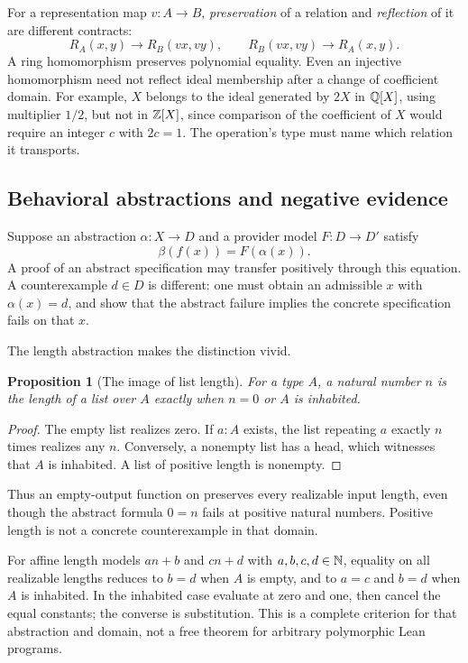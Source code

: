 \documentclass[11pt,a4paper]{article}
\newcommand{\code}[1]{\texttt{\small\detokenize{#1}}}
\newtheorem{proposition}[theorem]{Proposition}
\theoremstyle{definition}\newtheorem{definition}[theorem]{Definition}
\theoremstyle{remark}\newtheorem{remark}[theorem]{Remark}
\begin{document}
For a representation map $v:A\to B$, \emph{preservation} of a relation and \emph{reflection} of it are different contracts:
\[
 R_A(x,y)\to R_B(vx,vy),\qquad
 R_B(vx,vy)\to R_A(x,y).
\]
A ring homomorphism preserves polynomial equality. Even an injective homomorphism need not reflect ideal membership after a change of coefficient domain. For example, $X$ belongs to the ideal generated by $2X$ in $\mathbb Q[X]$, using multiplier $1/2$, but not in $\mathbb Z[X]$, since comparison of the coefficient of $X$ would require an integer $c$ with $2c=1$. The operation's type must name which relation it transports.

\subsection{Behavioral abstractions and negative evidence}
Suppose an abstraction $\alpha:X\to D$ and a provider model $F:D\to D'$ satisfy
\[
 \beta(f(x))=F(\alpha(x)).
\]
A proof of an abstract specification may transfer positively through this equation. A counterexample $d\in D$ is different: one must obtain an admissible $x$ with $\alpha(x)=d$, and show that the abstract failure implies the concrete specification fails on that $x$.

The length abstraction makes the distinction vivid.
\begin{proposition}[The image of list length]
For a type $A$, a natural number $n$ is the length of a list over $A$ exactly when $n=0$ or $A$ is inhabited.
\end{proposition}
\begin{proof}
The empty list realizes zero. If $a:A$ exists, the list repeating $a$ exactly $n$ times realizes any $n$. Conversely, a nonempty list has a head, which witnesses that $A$ is inhabited. A list of positive length is nonempty.
\end{proof}
Thus an empty-output function on \code{List Empty} preserves every realizable input length, even though the abstract formula $0=n$ fails at positive natural numbers. Positive length is not a concrete counterexample in that domain.

For affine length models $an+b$ and $cn+d$ with $a,b,c,d\in\mathbb N$, equality on all realizable lengths reduces to $b=d$ when $A$ is empty, and to $a=c$ and $b=d$ when $A$ is inhabited. In the inhabited case evaluate at zero and one, then cancel the equal constants; the converse is substitution. This is a complete criterion for that abstraction and domain, not a free theorem for arbitrary polymorphic Lean programs.
\end{document}

